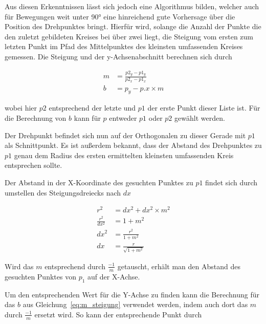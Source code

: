 
Aus diesen Erkenntnissen lässt sich jedoch eine Algorithmus bilden, welcher auch für Bewegungen weit unter 90° eine hinreichend gute Vorhersage über die Position des Drehpunktes bringt.
Hierfür wird, solange die Anzahl der Punkte die den zuletzt gebildeten Kreises bei über zwei liegt, die Steigung vom ersten zum letzten Punkt im Pfad des Mittelpunktes des kleinsten umfassenden Kreises gemessen.
Die Steigung und der y-Achsenabschnitt berechnen sich durch

\begin{equation}
    \begin{split}
        m &= \frac{p2_y - p1_y}{p2_x - p1_x} \\
        b &= p_y - p.x \times m
    \end{split}
    \label{eq:m_steigung}
\end{equation}

wobei hier $p2$ entsprechend der letzte und $p1$ der erste Punkt dieser Liste ist.
Für die Berechnung von $b$ kann für $p$ entweder $p1$ oder $p2$ gewählt werden.

Der Drehpunkt befindet sich nun auf der Orthogonalen zu dieser Gerade mit $p1$ als Schnittpunkt.
Es ist außerdem bekannt, dass der Abstand des Drehpunktes zu $p1$ genau dem Radius des ersten ermittelten kleinsten umfassenden Kreis entsprechen sollte.

Der Abstand in der X-Koordinate des gesuchten Punktes zu $p1$ findet sich durch umstellen des Steigungsdreiecks nach $dx$

\begin{equation}
    \begin{split}
        r^2 &= dx^2 + dx^2 \times m^2 \\
        \frac{r^2}{dx^2} &= 1 + m^2 \\
        dx^2 &= \frac{r^2}{1+m^2} \\
        dx &= \frac{r}{\sqrt{1 + m^2}}
    \end{split}
    \label{eq:steigungsdreieck}
\end{equation}

Wird das $m$ entsprechend durch $\frac{-1}{m}$ getauscht, erhält man den Abstand des gesuchten Punktes von $p_1$ auf der X-Achse.

Um den entsprechenden Wert für die Y-Achse zu finden kann die Berechnung für das $b$ aus Gleichung~\ref{eq:m_steigung} verwendet werden, indem auch dort das $m$ durch $\frac{-1}{m}$ ersetzt wird.
So kann der entsprechende Punkt durch

